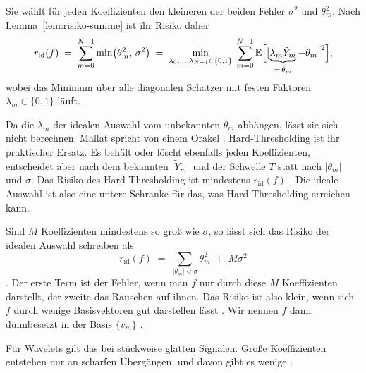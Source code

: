 \documentclass[a4paper,11pt,bibliography=totoc,listof=totoc,headinclude=true,cleardoublepage=empty,oneside]{scrbook}
\theoremstyle{plain}
\theoremstyle{definition}
\begin{document}
Sie wählt für jeden Koeffizienten den kleineren der beiden Fehler $\sigma^2$
und $\theta_m^2$. Nach Lemma~\ref{lem:risiko-summe} ist ihr Risiko daher
\begin{equation}
\label{eq:orakel}
  r_{\mathrm{id}}(f) \;=\; \sum_{m=0}^{N-1}\min\bigl(\theta_m^2,\,\sigma^2\bigr)
  \;=\; \min_{\lambda_0,\dots,\lambda_{N-1}\in\{0,1\}}\;
        \sum_{m=0}^{N-1}\mathbb E\Bigl[\bigl\lvert\underbrace{\lambda_m\tilde Y_m}_{=\,\hat\theta_m} - \theta_m\bigr\rvert^2\Bigr] ,
\end{equation}
wobei das Minimum über alle diagonalen Schätzer mit festen Faktoren
$\lambda_m\in\{0,1\}$ läuft. %
 
Da die $\lambda_m$ der idealen Auswahl vom unbekannten $\theta_m$ abhängen, lässt
sie sich nicht berechnen. Mallat spricht von einem Orakel
\cite[Kap.~11.2.1]{mallat}. %
Hard-Thresholding ist ihr praktischer Ersatz. Es behält oder löscht ebenfalls
jeden Koeffizienten, entscheidet aber nach dem bekannten $\lvert\tilde Y_m\rvert$
und der Schwelle $T$ statt nach $\lvert\theta_m\rvert$ und $\sigma$. Das Risiko des Hard-Thresholding ist mindestens $r_{\mathrm{id}}(f)$
\cite[Kap.~11.2.2]{mallat}. %
Die ideale Auswahl ist also eine untere Schranke für das, was
Hard-Thresholding erreichen kann.
 
Sind $M$ Koeffizienten mindestens so gro\ss{} wie $\sigma$, so lässt sich das
Risiko der idealen Auswahl schreiben als
\[
  r_{\mathrm{id}}(f) \;=\; \sum_{\lvert\theta_m\rvert<\sigma}\theta_m^2 \;+\; M\sigma^2
\]
\cite[Gl.~(11.36), (11.37)]{mallat}. %
Der erste Term ist der Fehler, wenn man $f$ nur durch diese $M$ Koeffizienten
darstellt, der zweite das Rauschen auf ihnen. Das Risiko ist also klein, wenn
sich $f$ durch wenige Basisvektoren gut darstellen lässt
\cite[Kap.~11.2.2]{mallat}. %
Wir nennen $f$ dann dünnbesetzt in der Basis $\{v_m\}$
\cite[Kap.~11.2.1]{mallat}. %
 
Für Wavelets gilt das bei stückweise glatten Signalen. Gro\ss e Koeffizienten
entstehen nur an scharfen Übergängen, und davon gibt es wenige
\cite[Kap.~11.3.1]{mallat}. %
 
\end{document}
